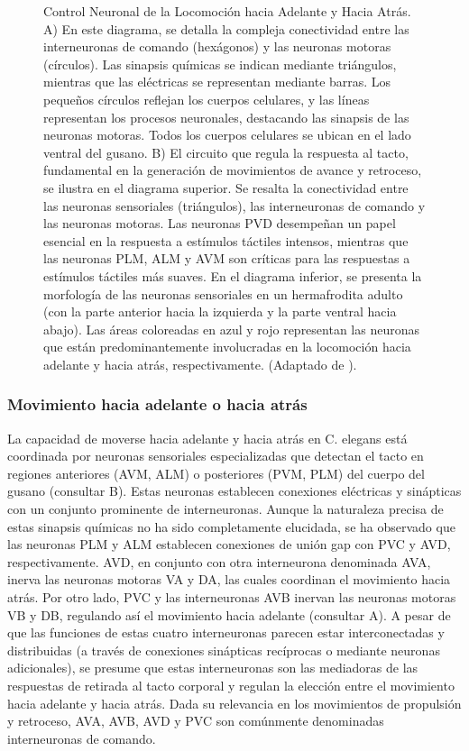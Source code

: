 \begin{figure}[h!]
	\caption[ Control Neuronal de la Locomoción hacia Adelante y Hacia Atrás ]{ Control Neuronal de la Locomoción hacia Adelante y Hacia Atrás. A) En este diagrama, se detalla la compleja conectividad entre las interneuronas de comando (hexágonos) y las neuronas motoras (círculos). Las sinapsis químicas se indican mediante triángulos, mientras que las eléctricas se representan mediante barras. Los pequeños círculos reflejan los cuerpos celulares, y las líneas representan los procesos neuronales, destacando las sinapsis de las neuronas motoras. Todos los cuerpos celulares se ubican en el lado ventral del gusano. 	B) El circuito que regula la respuesta al tacto, fundamental en la generación de movimientos de avance y retroceso, se ilustra en el diagrama superior. Se resalta la conectividad entre las neuronas sensoriales (triángulos), las interneuronas de comando y las neuronas motoras. Las neuronas PVD desempeñan un papel esencial en la respuesta a estímulos táctiles intensos, mientras que las neuronas PLM, ALM y AVM son críticas para las respuestas a estímulos táctiles más suaves. En el diagrama inferior, se presenta la morfología de las neuronas sensoriales en un hermafrodita adulto (con la parte anterior hacia la izquierda y la parte ventral hacia abajo). Las áreas coloreadas en azul y rojo representan las neuronas que están predominantemente involucradas en la locomoción hacia adelante y hacia atrás, respectivamente.   (Adaptado de \protect\cite{bono_neuronal_2005}).}\label{fig:movimiento}
\end{figure}



\subsubsection{Movimiento hacia adelante o hacia atrás}


La capacidad de moverse hacia adelante y hacia atrás en C. elegans está coordinada por neuronas sensoriales especializadas que detectan el tacto en regiones anteriores (AVM, ALM) o posteriores (PVM, PLM) del cuerpo del gusano (consultar B). Estas neuronas establecen conexiones eléctricas y sinápticas con un conjunto prominente de interneuronas. Aunque la naturaleza precisa de estas sinapsis químicas no ha sido completamente elucidada, se ha observado que las neuronas PLM y ALM establecen conexiones de unión gap con PVC y AVD, respectivamente. AVD, en conjunto con otra interneurona denominada AVA, inerva las neuronas motoras VA y DA, las cuales coordinan el movimiento hacia atrás. Por otro lado, PVC y las interneuronas AVB inervan las neuronas motoras VB y DB, regulando así el movimiento hacia adelante (consultar A). A pesar de que las funciones de estas cuatro interneuronas parecen estar interconectadas y distribuidas (a través de conexiones sinápticas recíprocas o mediante neuronas adicionales), se presume que estas interneuronas son las mediadoras de las respuestas de retirada al tacto corporal y regulan la elección entre el movimiento hacia adelante y hacia atrás. Dada su relevancia en los movimientos de propulsión y retroceso, AVA, AVB, AVD y PVC son comúnmente denominadas interneuronas de comando.



